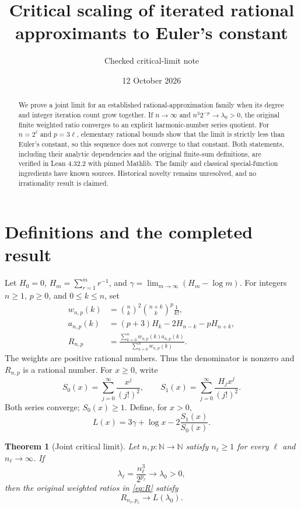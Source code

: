 \documentclass[11pt]{article}
\title{Critical scaling of iterated rational\protect\\approximants to Euler's constant}
\author{Checked critical-limit note}
\date{12 October 2026}
\newtheorem{theorem}{Theorem}
\newcommand{\N}{\mathbb N}
\begin{document}
\maketitle
\begin{abstract}
We prove a joint limit for an established rational-approximation family when its degree and integer iteration count grow together. If $n\to\infty$ and $n^3 2^{-p}\to\lambda_0>0$, the original finite weighted ratio converges to an explicit harmonic-number series quotient. For $n=2^\ell$ and $p=3\ell$, elementary rational bounds show that the limit is strictly less than Euler's constant, so this sequence does not converge to that constant. Both statements, including their analytic dependencies and the original finite-sum definitions, are verified in Lean 4.32.2 with pinned Mathlib. The family and classical special-function ingredients have known sources. Historical novelty remains unresolved, and no irrationality result is claimed.
\end{abstract}

\section{Definitions and the completed result}
Let $H_0=0$, $H_m=\sum_{r=1}^m r^{-1}$, and
$\gamma=\lim_{m\to\infty}(H_m-\log m)$. For integers $n\ge1$, $p\ge0$, and $0\le k\le n$, set
\begin{align}
w_{n,p}(k)&=\binom nk^2\binom{n+k}{k}^{p}\frac1{k!},\label{eq:w}\\
a_{n,p}(k)&=(p+3)H_k-2H_{n-k}-pH_{n+k},\label{eq:a}\\
R_{n,p}&=\frac{\sum_{k=0}^n w_{n,p}(k)a_{n,p}(k)}{\sum_{k=0}^n w_{n,p}(k)}.\label{eq:R}
\end{align}
The weights are positive rational numbers. Thus the denominator is nonzero and $R_{n,p}$ is a rational number. For $x\ge0$, write
\[
S_0(x)=\sum_{j=0}^\infty\frac{x^j}{(j!)^2},\qquad
S_1(x)=\sum_{j=0}^\infty\frac{H_jx^j}{(j!)^2}.
\]
Both series converge; $S_0(x)\ge1$. Define, for $x>0$,
\begin{equation}
L(x)=3\gamma+\log x-2\frac{S_1(x)}{S_0(x)}.
\label{eq:L}
\end{equation}

\begin{theorem}[Joint critical limit]\label{thm:critical}
Let $n,p:\N\to\N$ satisfy $n_\ell\ge1$ for every $\ell$ and $n_\ell\to\infty$. If
\[
\lambda_\ell=\frac{n_\ell^3}{2^{p_\ell}}\longrightarrow\lambda_0>0,
\]
then the original weighted ratios in \eqref{eq:R} satisfy
\[
R_{n_\ell,p_\ell}\longrightarrow L(\lambda_0).
\]
\end{theorem}
\end{document}
